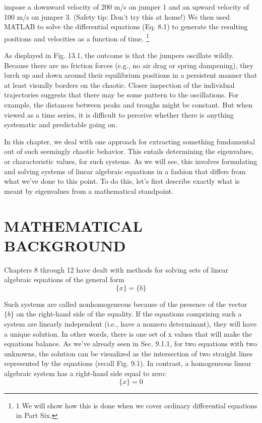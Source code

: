\documentclass[../main.tex]{subfiles}
\begin{document}
impose a downward velocity of 200 m/s on jumper 1 and an upward velocity of 100 m/s on
jumper 3. (Safety tip: Don't try this at home!) We then used MATLAB to solve the differential
equations (Eq. 8.1) to generate the resulting positions and velocities as a function of time.
\footnote{1 We will show how this is done when we cover ordinary differential equations in Part Six.}


As displayed in Fig. 13.1, the outcome is that the jumpers oscillate wildly. Because
there are no friction forces (e.g., no air drag or spring dampening), they lurch up and down
around their equilibrium positions in a persistent manner that at least visually borders on
the chaotic. Closer inspection of the individual trajectories suggests that there may be some
pattern to the oscillations. For example, the distances between peaks and troughs might be
constant. But when viewed as a time series, it is difficult to perceive whether there is anything systematic and predictable going on.


In this chapter, we deal with one approach for extracting something fundamental out
of such seemingly chaotic behavior. This entails determining the eigenvalues, or characteristic values, for such systems. As we will see, this involves formulating and solving systems of linear algebraic equations in a fashion that differs from what we've done to this
point. To do this, let's first describe exactly what is meant by eigenvalues from a mathematical standpoint.

\section{MATHEMATICAL BACKGROUND}
Chapters 8 through 12 have dealt with methods for solving sets of linear algebraic equations of the general form
\begin{equation}
[A]\{x\}=\{b\} \tag{13.1}
\end{equation}

Such systems are called nonhomogeneous because of the presence of the vector $\{b\}$ on the
right-hand side of the equality. If the equations comprising such a system are linearly
independent (i.e., have a nonzero determinant), they will have a unique solution. In other
words, there is one set of x values that will make the equations balance. As we've already
seen in Sec. 9.1.1, for two equations with two unknowns, the solution can be visualized as
the intersection of two straight lines represented by the equations (recall Fig. 9.1).
In contrast, a homogeneous linear algebraic system has a right-hand side equal to zero:
\begin{equation}
[A]\{x\}=0 \tag{13.2}
\end{equation}
\end{document}
